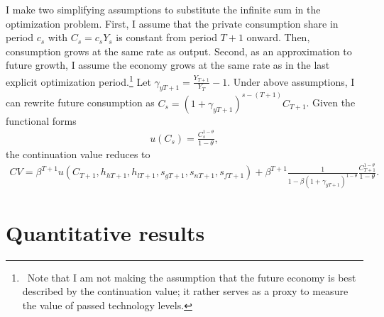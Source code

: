 I make two simplifying assumptions to substitute the infinite sum in the optimization problem. First, 
I assume that the private consumption share in period $c_s$ with $C_s=c_sY_s$ is constant from period $T+1$ onward.  Then, consumption grows at the same rate as output. 
Second, as an approximation to future growth, I assume the economy grows at the same rate as in the last explicit optimization period.\footnote{\ Note that I am not making the assumption that the future economy is best described by the continuation value; it rather serves as a proxy to measure the value of passed technology levels. } 
Let $\gamma_{yT+1}=\frac{Y_{T+1}}{Y_{T}}-1$. Under above assumptions, I can rewrite future consumption as $C_s=(1+\gamma_{yT+1})^{s-(T+1)}C_{T+1}$.
Given the functional forms
\begin{align*}
u(C_s)= \frac{C_s^{1-\theta}}{1-\theta},
\end{align*}
the continuation value reduces to
\begin{align*}
CV= \beta^{T+1} u(C_{T+1},h_{h{T+1}}, h_{l{T+1}}, s_{g{T+1}}, s_{n{T+1}}, s_{f{T+1}})+\beta^{T+1}\frac{1}{1-\beta (1+\gamma_{yT+1})^{1-\theta}}\frac{C_{T+1}^{1-\theta}}{1-\theta}.
\end{align*}
%

\section{Quantitative results}\label{app:quant_res}


